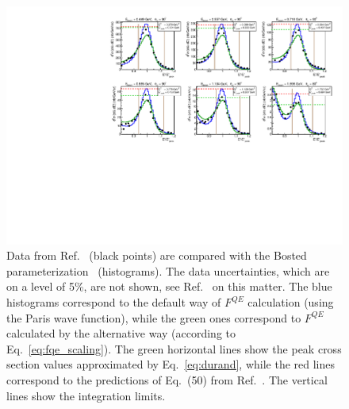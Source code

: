 \begin{figure}[htp]
\begin{center}
\includegraphics[width=\textwidth]{pictures/hanson.pdf}
\caption{\small  Data from Ref.~\cite{Hanson:1973vf} (black points) are compared with the Bosted parameterization~\cite{Bosted_fit,Bosted:2007xd} (histograms). The data uncertainties, which are on a level of 5\%, are not shown, see Ref.~\cite{Hanson:1973vf} on this matter. The blue histograms correspond to the default way of $F^{QE}$ calculation (using the Paris wave function), while the green ones correspond to $F^{QE}$ calculated by the alternative way (according to Eq.~\eqref{eq:fqe_scaling}). The green horizontal lines show the peak cross section values approximated by Eq.~\eqref{eq:durand}, while the red lines correspond to the predictions of Eq.~(50) from Ref.~\cite{Kocevar:1967}. The vertical lines show the integration limits.} \label{fig:hanson_QE}
\end{center}
\end{figure}


